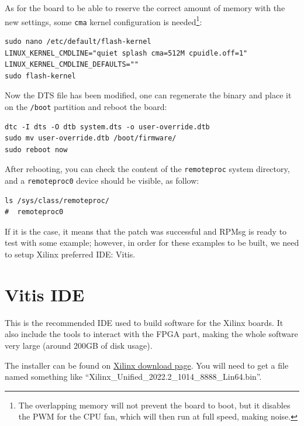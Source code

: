 \documentclass[10pt]{article}
\begin{document}
As for the board to be able to reserve the correct amount of memory with the new settings, some
\verb|cma| kernel configuration is needed\footnote{The overlapping memory will not prevent the board to boot,
  but it disables the PWM for the CPU fan, which will then run at full speed, making noise.}:
\begin{tcolorbox}
\begin{verbatim}
sudo nano /etc/default/flash-kernel
LINUX_KERNEL_CMDLINE="quiet splash cma=512M cpuidle.off=1"
LINUX_KERNEL_CMDLINE_DEFAULTS=""
sudo flash-kernel
\end{verbatim}
\end{tcolorbox}

Now the DTS file has been modified, one can regenerate the binary and place it on the \verb|/boot| partition
and reboot the board:
\begin{tcolorbox}
\begin{verbatim}
dtc -I dts -O dtb system.dts -o user-override.dtb
sudo mv user-override.dtb /boot/firmware/
sudo reboot now
\end{verbatim}
\end{tcolorbox}

After rebooting, you can check the content of the \verb|remoteproc| system directory,
and a \verb|remoteproc0| device should be visible, as follow:
\begin{tcolorbox}
\begin{verbatim}
ls /sys/class/remoteproc/
#  remoteproc0
\end{verbatim}
\end{tcolorbox}

If it is the case, it means that the patch was successful and RPMsg is
ready to test with some example; however, in order for these examples
to be built, we need to setup Xilinx preferred IDE: Vitis.



\section{Vitis IDE}
\label{sec:vitis-ide}
This is the recommended IDE used to build software for the Xilinx boards.
It also include the tools to interact with the FPGA part, making the whole
software very large (around 200GB of disk usage).

The installer can be found on \href{https://www.xilinx.com/support/download/index.html/content/xilinx/en/downloadNav/vitis.html}{Xilinx download page}. You will need to get
a file named something like ``Xilinx\_Unified\_2022.2\_1014\_8888\_Lin64.bin''.
\end{document}
